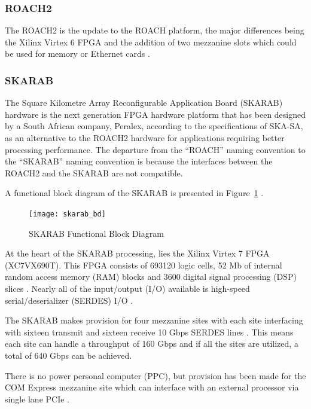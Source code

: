 \documentclass{ws-jai}
\begin{document}

\subsubsection{ROACH2}

The ROACH2 is the update to the ROACH platform, the major differences being the Xilinx Virtex 6 FPGA and the addition of two mezzanine slots which could be used for memory or Ethernet cards \cite{Casp12}.

\subsubsection{SKARAB}

The Square Kilometre Array Reconfigurable Application Board (SKARAB) hardware is the next generation FPGA hardware platform that has been designed by a South African company, Peralex, according to the specifications of SKA-SA, as an alternative to the ROACH2 hardware for applications requiring better processing performance. The departure from the ``ROACH'' naming convention to the ``SKARAB'' naming convention is because the interfaces between the ROACH2 and the SKARAB are not compatible.

A functional block diagram of the SKARAB is presented in Figure~\ref{fig:skarab_bd} \cite{cliff16}.

\begin{figure}[h]
\centering
\texttt{[image: skarab\_bd]}
\caption{SKARAB Functional Block Diagram}
\label{fig:skarab_bd}
\end{figure}

At the heart of the SKARAB processing, lies the Xilinx Virtex 7 FPGA (XC7VX690T). This FPGA consists of 693120 logic cells, 52 Mb of internal random access memory (RAM) blocks and 3600 digital signal processing (DSP) slices \cite{cliff16}. Nearly all of the input/output (I/O) available is high-speed serial/deserializer (SERDES) I/O \cite{Teag15}.

The SKARAB makes provision for four mezzanine sites with each site interfacing with sixteen transmit and sixteen receive 10 Gbps SERDES lines \cite{cliff16}. This means each site can handle a throughput of 160 Gbps and if all the sites are utilized, a total of 640 Gbps can be achieved.

There is no power personal computer (PPC), but provision has been made for the COM Express mezzanine site which can interface with an external processor via single lane PCIe \cite{Teag15}.
\end{document}
